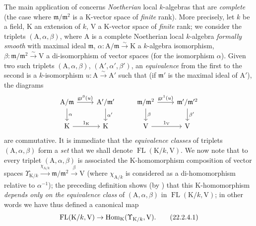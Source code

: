 \begin{env}[22.2.4]
\label{0.22.2.4}
The main application of  concerns \emph{Noetherian} local $k$-algebras that are \emph{complete} (the case where $\mathfrak{m}/\mathfrak{m}^2$ is a $\mathrm{K}$-vector space of \emph{finite} rank).
More precisely, let $k$ be a field, $\mathrm{K}$ an extension of $k$, $\mathrm{V}$ a $\mathrm{K}$-vector space of
\emph{finite} rank; we consider the triplets $(\mathrm{A},\alpha,\beta)$, where $\mathrm{A}$ is a complete Noetherian local $k$-algebra \emph{formally smooth} with maximal ideal $\mathfrak{m}$, $\alpha:\mathrm{A}/\mathfrak{m}\xrightarrow{\sim}\mathrm{K}$ a $k$-algebra isomorphism, $\beta:\mathfrak{m}/\mathfrak{m}^2\xrightarrow{\sim}\mathrm{V}$ a di-isomorphism of vector spaces (for the isomorphism $\alpha$).
Given two such triplets $(\mathrm{A},\alpha,\beta)$, $(\mathrm{A}',\alpha',\beta')$, an \emph{equivalence} from the first to the second is a $k$-isomorphism $u:\mathrm{A}\xrightarrow{\sim}\mathrm{A}'$ such that (if $\mathfrak{m}'$ is the maximal ideal of $\mathrm{A}'$), the diagrams
\[
  \begin{tikzcd}
    \mathrm{A}/\mathfrak{m} \ar[r,"\gr^0(u)"] \ar[d,"\alpha"] & \mathrm{A}'/\mathfrak{m}' \ar[d,"\alpha'"] & \mathfrak{m}/\mathfrak{m}^2 \ar[r,"\gr^1(u)"] \ar[d,"\beta"] & \mathfrak{m}'/\mathfrak{m}'^2 \ar[d,"\beta'"]\\
    \mathrm{K} \ar[r,"1_\mathrm{K}"] & \mathrm{K} & \mathrm{V} \ar[r,"1_\mathrm{V}"] & \mathrm{V}
  \end{tikzcd}
\]
are commutative.
It is immediate that the \emph{equivalence classes} of triplets $(\mathrm{A},\alpha,\beta)$ form a \emph{set} that we shall denote $\operatorname{FL}(\mathrm{K}/k,\mathrm{V})$.
We now note that to every triplet $(\mathrm{A},\alpha,\beta)$ is associated the $\mathrm{K}$-homomorphism composition of vector spaces $\Upsilon_{\mathrm{K}/k}\xrightarrow{\chi_{\mathrm{A}/k}}\mathfrak{m}/\mathfrak{m}^2\xrightarrow{\beta}\mathrm{V}$ (where $\chi_{\mathrm{A}/k}$ is considered as a di-homomorphism relative to $\alpha^{-1}$); the preceding definition shows (by ) that this $\mathrm{K}$-homomorphism \emph{depends only on the equivalence class} of $(\mathrm{A},\alpha,\beta)$ in $\operatorname{FL}(\mathrm{K}/k,\mathrm{V})$; in other words we have thus defined a canonical map
\[
\label{0.22.2.4.1}
  \operatorname{FL}(\mathrm{K}/k,\mathrm{V})\to\operatorname{Hom}_\mathrm{K}(\Upsilon_{\mathrm{K}/k},\mathrm{V}).
  \tag{22.2.4.1}
\]
\end{env}

